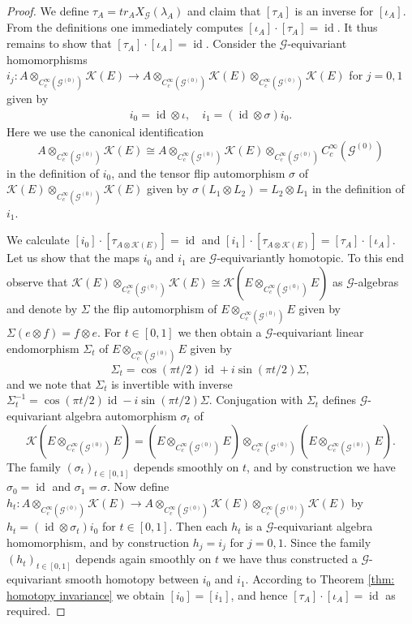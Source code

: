\documentclass{amsart}
\newcommand{\G}{\mathcal{G}}
\newcommand{\K}{\mathcal{K}}
\newcommand{\ccinfty}{C_c^\infty}
\DeclareMathOperator{\id}{id}
\begin{document}
\begin{proof}
We define $ \tau_A = tr_A X_\G(\lambda_A) $ and claim that $ [\tau_A] $ is an inverse for $ [\iota_A] $. From the definitions one immediately computes 
$ [\iota_A] \cdot [\tau_A] = \id $. 
It thus remains to show that $ [\tau_A] \cdot
[\iota_A] = \id $. Consider the $ \G $-equivariant homomorphisms $ i_j: A \otimes_{\ccinfty(\G^{(0)})} \K(E) \rightarrow A \otimes_{\ccinfty(\G^{(0)})} \K(E) \otimes_{\ccinfty(\G^{(0)})} \K(E) $ for $ j = 0,1 $ given by 
\begin{align*}
i_0 = \id \otimes \iota, \quad 
i_1 = (\id \otimes \sigma) i_0. 
\end{align*}
Here we use the canonical identification 
$$ 
A \otimes_{\ccinfty(\G^{(0)})} \K(E) \cong A \otimes_{\ccinfty(\G^{(0)})} \K(E) \otimes_{\ccinfty(\G^{(0)})} \ccinfty(\G^{(0)}) 
$$ 
in the definition of $ i_0 $, and the tensor flip automorphism $ \sigma $ of $ \K(E) \otimes_{\ccinfty(\G^{(0)})} \K(E) $ given by $ \sigma(L_1 \otimes L_2) = L_2 \otimes L_1 $ in the definition of $ i_1 $. 

We calculate $ [i_0] \cdot [\tau_{A\otimes \K(E)}] = \id  $ 
and $ [i_1] \cdot [\tau_{A \otimes \K(E)}] =
[\tau_A] \cdot [\iota_A] $. Let us show that the maps $ i_0 $ and $ i_1 $ are $ \G $-equivariantly homotopic. To this end observe that $ \K(E) \otimes_{\ccinfty(\G^{(0)})} \K(E) \cong \K(E \otimes_{\ccinfty(\G^{(0)})} E)$ as $ \G $-algebras and denote by $ \Sigma $ the flip automorphism of $ E \otimes_{\ccinfty(\G^{(0)})} E $ given by $ \Sigma (e \otimes f) = f \otimes e $. For $ t \in [0,1] $ we then obtain a $ \G $-equivariant linear endomorphism $ \Sigma_t $ of $ E \otimes_{\ccinfty(\G^{(0)})} E $ given by
$$ 
\Sigma_t = \cos(\pi t/2) \id + i \sin(\pi t/2) \Sigma,
$$
and we note that $ \Sigma_t $ is invertible with inverse $ \Sigma_t^{-1} = \cos(\pi t/2) \id - i \sin(\pi t/2) \Sigma $. Conjugation with $ \Sigma_t $ defines $ \G $-equivariant algebra automorphism $ \sigma_t $ of 
$$ 
\K(E \otimes_{\ccinfty(\G^{(0)})} E) = (E \otimes_{\ccinfty(\G^{(0)})} E) \otimes_{\ccinfty(\G^{(0)})} (E \otimes_{\ccinfty(\G^{(0)})} E). 
$$ 
The family $ (\sigma_t)_{t \in [0,1]} $ depends smoothly on $ t $, and by construction we have 
$ \sigma_0 = \id $ and $ \sigma_1 = \sigma $. Now define $ h_t: A \otimes_{\ccinfty(\G^{(0)})} \K(E) \rightarrow 
A \otimes_{\ccinfty(\G^{(0)})} \K(E) \otimes_{\ccinfty(\G^{(0)})} \K(E) $ by $ h_t = (\id \otimes \sigma_t) i_0 $ for $ t \in [0,1] $. Then each $ h_t $ is a $ \G $-equivariant algebra homomorphism, and by construction
$ h_j = i_j $ for $ j = 0,1 $. Since the family $ (h_t)_{t \in [0,1]} $ depends again smoothly on $ t $ we have thus constructed a $ \G $-equivariant smooth homotopy between $ i_0 $ and $ i_1 $. According to Theorem \ref{thm: homotopy invariance} we obtain $ [i_0] = [i_1] $, and hence $ [\tau_A] \cdot [\iota_A] = \id $ as required. 
\end{proof}
\end{document}
